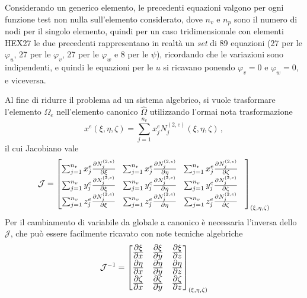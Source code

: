 Considerando un generico elemento, le precedenti equazioni valgono per ogni funzione test non 
nulla sull'elemento considerato, dove $n_v$ e $n_p$ sono il numero di nodi per il singolo elemento, 
quindi per un caso tridimensionale con elementi HEX27 le due precedenti rappresentano 
in realtà un \textit{set} di 89 equazioni (27 per le $\varphi_{u}$, 
27 per le $\varphi_{v}$, 27 per le $\varphi_w$ e 8 per le $\psi$), ricordando che le variazioni 
sono indipendenti, e quindi le equazioni per le $u$ si ricavano ponendo $\varphi_{v}=0$ 
e $\varphi_w=0$, e viceversa. 

Al fine di ridurre il problema ad un sistema algebrico, si vuole trasformare l'elemento $\Omega_e$
nell'elemento canonico $\hat{\Omega}$ utilizzando l'ormai nota trasformazione
\begin{equation}
	x^e(\xi,\eta,\zeta)=\sum_{j=1}^{n_v}x_j^e N_j^{(2,e)}(\xi,\eta,\zeta) \,,
\end{equation}
il cui Jacobiano vale
{
	\everymath{\displaystyle}
\begin{equation}\renewcommand{\arraystretch}{1.6}\setlength{\arraycolsep}{4pt}
	\mathcal{J}=\begin{bmatrix}
\sum_{j=1}^{n_v}x_j^e\frac{\partial N_j^{(2,e)}}{\partial \xi} &
\sum_{j=1}^{n_v}x_j^e\frac{\partial N_j^{(2,e)}}{\partial \eta} &
\sum_{j=1}^{n_v}x_j^e\frac{\partial N_j^{(2,e)}}{\partial \zeta}\\
\sum_{j=1}^{n_v}y_j^e\frac{\partial N_j^{(2,e)}}{\partial \xi} &
\sum_{j=1}^{n_v}y_j^e\frac{\partial N_j^{(2,e)}}{\partial \eta} &
\sum_{j=1}^{n_v}y_j^e\frac{\partial N_j^{(2,e)}}{\partial \zeta} \\
\sum_{j=1}^{n_v}z_j^e\frac{\partial N_j^{(2,e)}}{\partial \xi} &
\sum_{j=1}^{n_v}z_j^e\frac{\partial N_j^{(2,e)}}{\partial \eta} &
\sum_{j=1}^{n_v}z_j^e\frac{\partial N_j^{(2,e)}}{\partial \zeta} &
\end{bmatrix}_{(\xi,\eta,\zeta)}
\end{equation}
}%
Per il cambiamento di variabile da globale a canonico è necessaria l'inversa
dello $\mathcal{J}$, che può essere facilmente ricavato con note tecniche
algebriche
\begin{eqnarray}\renewcommand{\arraystretch}{1.4}\setlength{\arraycolsep}{5pt}
	\mathcal{J}^{-1}=
 \begin{bmatrix}
\frac{\displaystyle\partial \xi}{\displaystyle\partial x} &
\frac{\displaystyle\partial \xi}{\displaystyle\partial y} & 
\frac{\displaystyle\partial \xi}{\displaystyle\partial z} \\
\frac{\displaystyle\partial \eta}{\displaystyle\partial x} &
\frac{\displaystyle\partial \eta}{\displaystyle\partial y}&
\frac{\displaystyle\partial \eta}{\displaystyle\partial z} \\
\frac{\displaystyle\partial \zeta}{\displaystyle\partial x} &
\frac{\displaystyle\partial \zeta}{\displaystyle\partial y}& 
\frac{\displaystyle\partial \zeta}{\displaystyle\partial z}
\end{bmatrix}_{(\xi,\eta,\zeta)}
\end{eqnarray}
